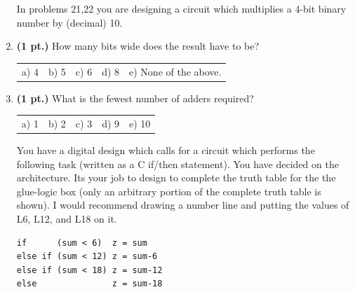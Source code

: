 \documentclass{article}
\begin{document}
\begin{enumerate}

In problems 21,22 you are designing a circuit which multiplies
a 4-bit binary number by (decimal) 10.

\item {\bf (1 pt.)} How many bits wide does the result have to be?

\begin{tabular}{p{0.6in} p{0.6in} p{0.6in} p{0.6in} l}
a) 4 & b) 5 & c) 6 & d) 8 & e) None of the above. \\
\end{tabular}

\item {\bf (1 pt.)} What is the fewest number of adders required?

\begin{tabular}{p{0.6in} p{0.6in} p{0.6in} p{0.6in} l}
a) 1 & b) 2 & c) 3 & d) 9 &  e) 10 \\
\end{tabular}


\pagebreak
You have a digital design which calls for a circuit which performs the 
following task (written as a C if/then statement).  You have decided on 
the architecture.  Its your job to design to complete the truth table
for the the glue-logic box (only an arbitrary portion of the complete 
truth table is shown).  I would recommend drawing a number line 
and putting the values of L6, L12, and L18 on it.  

\begin{verbatim}
if      (sum < 6)  z = sum
else if (sum < 12) z = sum-6
else if (sum < 18) z = sum-12
else               z = sum-18
\end{verbatim}


\end{enumerate}
\end{document}
